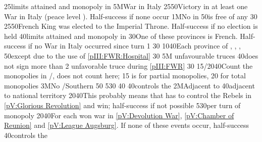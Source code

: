 %
%
{}{25}{\MNU limits attained and monopoly in }%
%
%
\EUobjective5M{War in Italy}{}%
{25}{50}{Victory in at least one War in Italy (peace level ). Half-success if none occur}%
%
%
\EUobjective1M{No \Presidio in \provincePicardie}{}%
{}{50}{\provincePicardie is free of any \Presidio}%
%
%
{}{30}{}%
%
%
{25}{50}{French King was elected to the Imperial Throne. Half-success if no
  election is held}%
%
%
{}{40}{\MNU limits attained and monopoly in }%
%
%
{}{30}{One of these provinces is French. Half-success if no War in Italy
  occurred since turn 1}%
%
%
%
{}{30}{}%
%
%
%
{10}{40}{Each province of \provinceArtois, \provinceBresse,
  , \provinceRoussillon}%
%
%
%
{}{50}{except due to the use of \ref{pIII:FWR:Hospital}}%
%
%
%
{}{30}{}%
%
%
\EUobjective5M{ unfavourable truces}{}%
{}{40}{\paysmajeurFrance does not sign more than 2 unfavorable truce during
  \ref{pIII:FWR}}%
%
%
%
{}{30}{}%
%
%
%
{15/20}{40}{Count the monopolies in \STZ/\CTZ,  does not count
  here; 15 is for partial monopolies, 20 for total monopolies}%
%
%
\EUobjective3M{No \GE/Southern \HRE}{}%
{}{50}{}%
%
%
{5}{30}{}%
%
%
{}{40}{}%
%
%
%
{}{40}{\paysmajeurFrance controls the }%
%
\EUobjective2M{Adjacent to \paysmajeurHollande}{}%
{}{40}{\paysmajeurFrance adjacent to \paysmajeurHollande national territory}%
%
%
{20}{40}{This probably means that \paysmajeurFrance has to control the Rebels
  in \ref{pV:Glorious Revolution} and win; half-success if not possible}%
%
%
{5}{30}{per turn of  monopoly}%
%
%
{20}{40}{For each won war in \ref{pV:Devolution War}, \ref{pV:Chamber of
    Reunion} and \ref{pV:League Augsburg}. If none of these events occur,
  half-success}%
%
%
%
{}{40}{\paysmajeurFrance controls the }%
